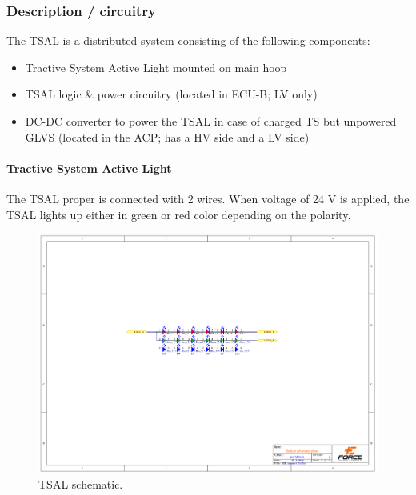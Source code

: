 \subsubsection{Description / circuitry}

The TSAL is a distributed system consisting of the following components:
\begin{itemize}
\item Tractive System Active Light mounted on main hoop
\item TSAL logic \& power circuitry (located in ECU-B; LV only)
\item DC-DC converter to power the TSAL in case of charged TS but unpowered GLVS (located in the ACP; has a HV side and a LV side)
\end{itemize}

\paragraph{Tractive System Active Light}

The TSAL proper is connected with 2 wires. When voltage of 24 V is applied, the TSAL lights up either in green or red color depending on the polarity.

\begin{figure}[H]
	\centering
	\includegraphics[width=\textwidth,trim={6cm 10cm 6cm 7cm},clip]{./img/TSAL-schematic.pdf}
	\caption{TSAL schematic.}
	\label{fig:TSAL-schematic}
\end{figure}

